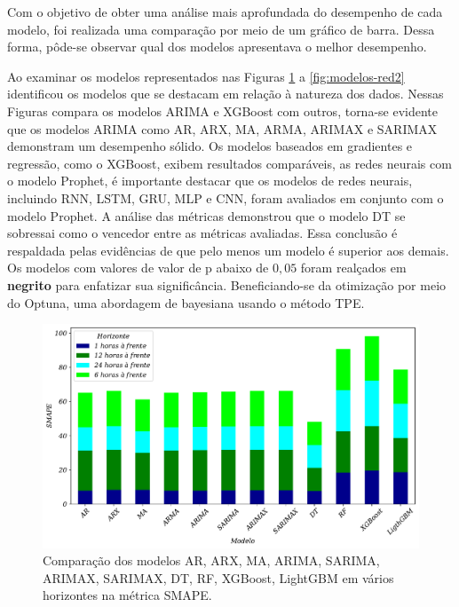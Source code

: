 Com o objetivo de obter uma análise mais aprofundada do desempenho de cada modelo, foi realizada uma comparação por meio de um gráfico de barra. Dessa forma, pôde-se observar qual dos modelos apresentava o melhor desempenho.

Ao examinar os modelos representados nas Figuras \ref{fig:modelos-arima1} a \ref{fig:modelos-red2} identificou os modelos que se destacam em relação à natureza dos dados. Nessas Figuras compara os modelos ARIMA e XGBoost com outros, torna-se evidente que os modelos ARIMA como AR, ARX, MA, ARMA, ARIMAX e SARIMAX demonstram um desempenho sólido. Os modelos baseados em gradientes e regressão, como o XGBoost, exibem resultados comparáveis, as redes neurais com o modelo Prophet, é importante destacar que os modelos de redes neurais, incluindo RNN, LSTM, GRU, MLP e CNN, foram avaliados em conjunto com o modelo Prophet. A análise das métricas demonstrou que o modelo DT se sobressai como o vencedor entre as métricas avaliadas. Essa conclusão é respaldada pelas evidências de que pelo menos um modelo é superior aos demais. Os modelos com valores de valor de p abaixo de $0,05$ foram realçados em \textbf{negrito} para enfatizar sua significância. Beneficiando-se da otimização por meio do Optuna, uma abordagem de bayesiana usando o método TPE.



\begin{figure}[H]
	\centering
	\caption{Comparação dos modelos AR, ARX, MA, ARIMA, SARIMA, ARIMAX, SARIMAX, DT, RF, XGBoost, LightGBM em vários horizontes na métrica SMAPE.}\label{fig:modelos-arima1}
	\includegraphics[width=0.7\linewidth]{Resultados/Figuras/smape_comparar_basic}
	
	
\end{figure}

